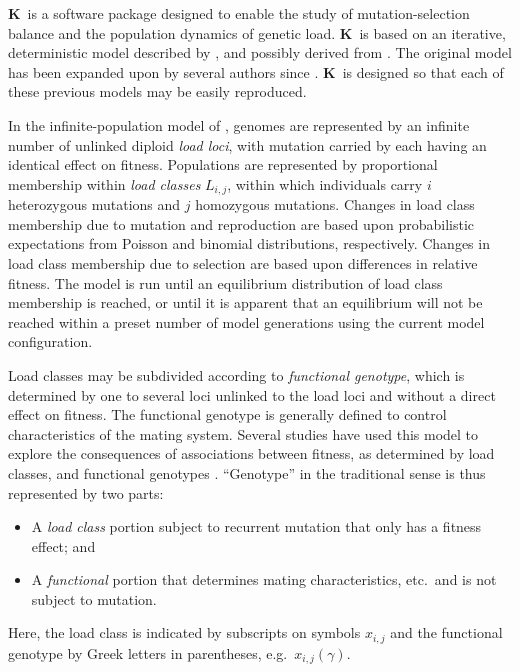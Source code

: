 \documentclass[12pt,twoside,letterpaper,fleqn]{report}
\numberwithin{equation}{section}  %
\newcommand{\K}{{\bf K}}
\newcommand{\xijg}{\mbox{$x_{i,j}(\gamma)$}}
\newcommand{\Lij}{\mbox{$L_{i,j}$}}              %
\begin{document}
\K\ is a software package designed to enable the study of mutation-selection balance and the population dynamics of genetic load.  \K\ is based on an iterative, deterministic model described by \citet{Kondrashov:1985:5375}, and possibly derived from \citet{Heller:1979:10277}.  The original model has been expanded upon by several authors since \citep[e.g.,][and others]{Charlesworth:1990:5337, Lande:1994:5345, Muirhead:1997:5426, Morgan:2001:5443}.  \K\ is designed so that each of these previous models may be easily reproduced.

In the infinite-population model of \citet{Kondrashov:1985:5375}, genomes are represented by an infinite number of unlinked diploid {\em load loci}, with mutation carried by each having an identical effect on fitness.  Populations are represented by proportional membership within {\em load classes} \Lij, within which individuals carry $i$ heterozygous mutations and $j$ homozygous mutations.  Changes in load class membership due to mutation and reproduction are based upon probabilistic expectations from Poisson and binomial distributions, respectively.  Changes in load class membership due to selection are based upon differences in relative fitness.  The model is run until an equilibrium distribution of load class membership is reached, or until it is apparent that an equilibrium will not be reached within a preset number of model generations using the current model configuration.

Load classes may be subdivided according to {\em functional genotype}, which is determined by one to several loci unlinked to the load loci and without a direct effect on fitness.  The functional genotype is generally defined to control characteristics of the mating system.  Several studies have used this model to explore the consequences of associations between fitness, as determined by load classes, and functional genotypes \citep[and others]{Kondrashov:1985:5375, Charlesworth:1990:5337}.  ``Genotype'' in the traditional sense is thus represented by two parts:
\begin{itemize}
	\item A {\em load class} portion subject to recurrent mutation that only has a fitness effect; and
	\item A {\em functional} portion that determines mating characteristics, etc.\ and is not subject to mutation.
\end{itemize}
Here, the load class is indicated by subscripts on symbols $x_{i,j}$ and the functional genotype by Greek letters in parentheses, e.g.\ \xijg.
\end{document}
